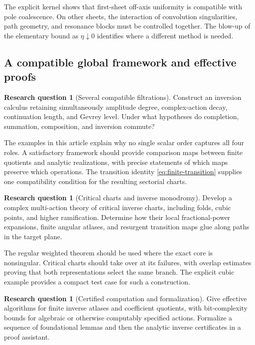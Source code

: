 \documentclass[11pt,a4paper]{article}
\numberwithin{equation}{section}
\theoremstyle{definition}
\newtheorem{question}[theorem]{Research question}
\theoremstyle{remark}
\begin{document}
The explicit kernel shows that first-sheet off-axis uniformity is
compatible with pole coalescence. On other sheets, the interaction
of convolution singularities, path geometry, and resonance blocks
must be controlled together. The blow-up of the elementary bound
as $\eta\downarrow0$ identifies where a different method is needed.

\subsection{A compatible global framework and effective proofs}

\begin{question}[Several compatible filtrations]
Construct an inversion calculus retaining simultaneously
amplitude degree, complex-action decay, continuation length,
and Gevrey level.
Under what hypotheses do completion, summation, composition,
and inversion commute?
\end{question}

The examples in this article explain why no single scalar order
captures all four roles. A satisfactory framework should provide
comparison maps between finite quotients and analytic realizations,
with precise statements of which maps preserve which operations.
The transition identity \eqref{eq:finite-transition} supplies one
compatibility condition for the resulting sectorial charts.

\begin{question}[Critical charts and inverse monodromy]
Develop a complex multi-action theory of critical inverse charts,
including folds, cubic points, and higher ramification.
Determine how their local fractional-power expansions, finite
angular atlases, and resurgent transition maps glue along paths
in the target plane.
\end{question}

The regular weighted theorem should be used where the exact core
is nonsingular. Critical charts should take over at its failures,
with overlap estimates proving that both representations select
the same branch. The explicit cubic example provides a compact
test case for such a construction.

\begin{question}[Certified computation and formalization]
Give effective algorithms for finite inverse atlases and coefficient
quotients, with bit-complexity bounds for algebraic or otherwise
computably specified actions.
Formalize a sequence of foundational lemmas and then the analytic
inverse certificates in a proof assistant.
\end{question}
\end{document}

